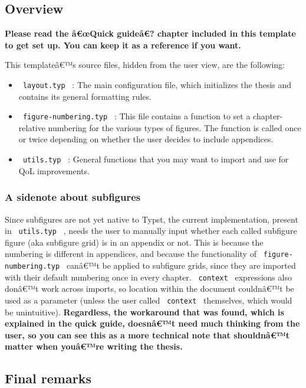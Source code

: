 \subsection{Overview}\label{overview}

\textbf{Please read the â€œQuick guideâ€? chapter included in this
template to get set up. You can keep it as a reference if you want.}

This templateâ€™s source files, hidden from the user view, are the
following:

\begin{itemize}
\item
  \texttt{\ layout.typ\ } : The main configuration file, which
  initializes the thesis and contains its general formatting rules.
\item
  \texttt{\ figure-numbering.typ\ } : This file contains a function to
  set a chapter-relative numbering for the various types of figures. The
  function is called once or twice depending on whether the user decides
  to include appendices.
\item
  \texttt{\ utils.typ\ } : General functions that you may want to import
  and use for QoL improvements.
\end{itemize}

\subsubsection{A sidenote about
subfigures}\label{a-sidenote-about-subfigures}

Since subfigures are not yet native to Typst, the current
implementation, present in \texttt{\ utils.typ\ } , needs the user to
manually input whether each called subfigure figure (aka subfigure grid)
is in an appendix or not. This is because the numbering is different in
appendices, and because the functionality of
\texttt{\ figure-numbering.typ\ } canâ€™t be applied to subfigure grids,
since they are imported with their default numbering once in every
chapter. \texttt{\ context\ } expressions also donâ€™t work across
imports, so location within the document couldnâ€™t be used as a
parameter (unless the user called \texttt{\ context\ } themselves, which
would be unintuitive). \textbf{Regardless, the workaround that was
found, which is explained in the quick guide, doesnâ€™t need much
thinking from the user, so you can see this as a more technical note
that shouldnâ€™t matter when youâ€™re writing the thesis.}

\subsection{Final remarks}\label{final-remarks}

